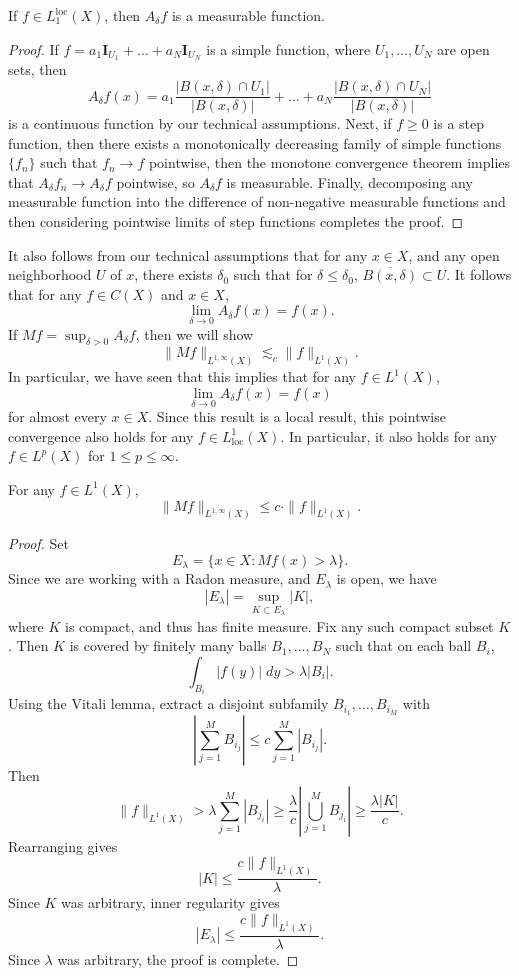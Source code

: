 \begin{lemma}
  If $f \in L_1^{\text{loc}}(X)$, then $A_\delta f$ is a measurable function.
\end{lemma}
\begin{proof}
  If $f = a_1 \mathbf{I}_{U_1} + \dots + a_N \mathbf{I}_{U_N}$ is a simple function, where $U_1,\dots,U_N$ are open sets, then
  \[ A_\delta f(x) = a_1 \frac{|B(x,\delta) \cap U_1|}{|B(x,\delta)|} + \dots + a_N \frac{|B(x,\delta) \cap U_N|}{|B(x,\delta)|} \]
  is a continuous function by our technical assumptions. Next, if $f \geq 0$ is a step function, then there exists a monotonically decreasing family of simple functions $\{ f_n \}$ such that $f_n \to f$ pointwise, then the monotone convergence theorem implies that $A_\delta f_n \to A_\delta f$ pointwise, so $A_\delta f$ is measurable. Finally, decomposing any measurable function into the difference of non-negative measurable functions and then considering pointwise limits of step functions completes the proof.
\end{proof}

It also follows from our technical assumptions that for any $x \in X$, and any open neighborhood $U$ of $x$, there exists $\delta_0$ such that for $\delta \leq \delta_0$, $\overline{B(x,\delta)} \subset U$. It follows that for any $f \in C(X)$ and $x \in X$,
%
\[ \lim_{\delta \to 0} A_\delta f(x) = f(x). \]
%
If $Mf = \sup_{\delta > 0} A_\delta f$, then we will show
%
\[ \| Mf \|_{L^{1,\infty}(X)} \lesssim_c \| f \|_{L^1(X)}. \]
%
In particular, we have seen that this implies that for any $f \in L^1(X)$,
%
\[ \lim_{\delta \to 0} A_\delta f(x) = f(x) \]
%
for almost every $x \in X$. Since this result is a local result, this pointwise convergence also holds for any $f \in L^1_{\text{loc}}(X)$. In particular, it also holds for any $f \in L^p(X)$ for $1 \leq p \leq \infty$.

\begin{theorem}
  For any $f \in L^1(X)$,
  \[ \| Mf \|_{L^{1,\infty}(X)} \leq c \cdot \| f \|_{L^1(X)}. \]
\end{theorem}
\begin{proof}
  Set
  \[ E_\lambda = \{ x \in X: Mf(x) > \lambda \}. \]
  Since we are working with a Radon measure, and $E_\lambda$ is open, we have
  \[ |E_\lambda| = \sup_{K \subset E_\lambda} |K|, \]
  where $K$ is compact, and thus has finite measure. Fix any such compact subset $K$. Then $K$ is covered by finitely many balls $B_1,\dots,B_N$ such that on each ball $B_i$,
  \[ \int_{B_i} |f(y)|\; dy > \lambda |B_i|. \]
  Using the Vitali lemma, extract a disjoint subfamily $B_{i_1},\dots, B_{i_M}$ with
  \[ \left| \sum_{j = 1}^M B_{i_j} \right| \leq c \sum_{j = 1}^M |B_{i_j}|. \]
  Then
  \[ \| f \|_{L^1(X)} > \lambda \sum_{j = 1}^M |B_{j_i}| \geq \frac{\lambda}{c} \left| \bigcup_{j = 1}^M B_{j_i} \right| \geq \frac{\lambda |K|}{c}. \]
  Rearranging gives
  \[ |K| \leq \frac{c \| f \|_{L^1(X)}}{\lambda}. \]
  Since $K$ was arbitrary, inner regularity gives
  \[ |E_\lambda| \leq \frac{c \| f \|_{L^1(X)}}{\lambda}. \]
  Since $\lambda$ was arbitrary, the proof is complete.
\end{proof}

